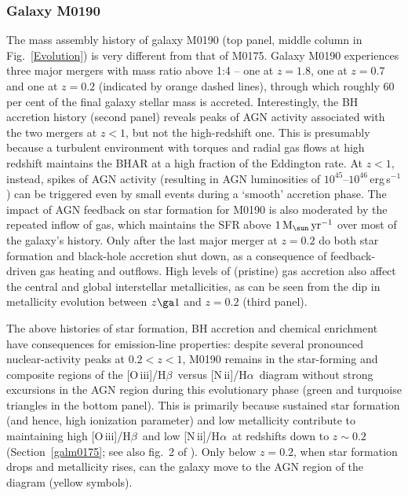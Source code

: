 \documentclass[fleqn,usenatbib]{mnras}
\newcommand{\Msun}{\hbox{M$_\sun$}}
\newcommand{\oiiihb}{\hbox{[O\,{\sc iii}]/H$\beta$}}
\newcommand{\niiha}{\hbox{[N\,{\sc ii}]/H$\alpha$}}
\begin{document}
\subsubsection{Galaxy M0190}\label{galm0190}

The mass assembly history of galaxy M0190  (top panel, middle column
in Fig.~\ref{Evolution}) is very different from that of M0175. Galaxy
M0190 experiences three major mergers with mass ratio above 1:4 -- one
at $z =1.8$, one at $z = 0.7$ and one at $z = 0.2$ (indicated by orange
dashed lines), through which roughly 60 per cent of the final galaxy
stellar mass is accreted. Interestingly, the BH accretion history
(second panel) reveals peaks of AGN activity associated with the two
mergers at $z<1$, but not the high-redshift one. This is presumably
because a turbulent environment with torques and radial gas flows at
high redshift maintains the BHAR at a high fraction of the Eddington
rate. At $z<1$, instead, spikes of AGN activity (resulting in AGN
luminosities of $10^{45}$--$10^{46}$\,erg\,s$^{-1}$) can be triggered
even by small events during a `smooth'  accretion phase. The impact of
AGN feedback on star formation for M0190 is also moderated by the
repeated inflow of gas, which maintains the SFR above
$1\,\Msun\,\mathrm{yr}^{-1}$ over most of the galaxy's history. Only
after the last major merger at $z = 0.2$ do both star formation and
black-hole accretion shut down, as a consequence of feedback-driven
gas heating and outflows.  High levels of (pristine) gas accretion
also affect the central and global interstellar  metallicities, as can
be seen from the dip in metallicity evolution between $z\ga1$ and
$z=0.2$  (third panel). 

The above histories of star formation, BH accretion and chemical
enrichment have  consequences for emission-line properties: despite
several pronounced nuclear-activity peaks at $0.2<z<1$, M0190 remains
in the star-forming  and composite regions of the \oiiihb\ versus
\niiha\ diagram without strong  excursions in the AGN region during
this evolutionary phase (green and turquoise triangles in  the bottom
panel). This is primarily because sustained star formation (and hence,
high  ionization parameter) and low metallicity contribute to
maintaining high \oiiihb\ and  low \niiha\ at redshifts down to
$z\sim0.2$ (Section~\ref{galm0175}; see also fig.~2 of
\citealt{Feltre16}). Only below $z=0.2$, when star formation drops and
metallicity rises,  can the galaxy move to the AGN region of the
diagram (yellow symbols). 
\end{document}
